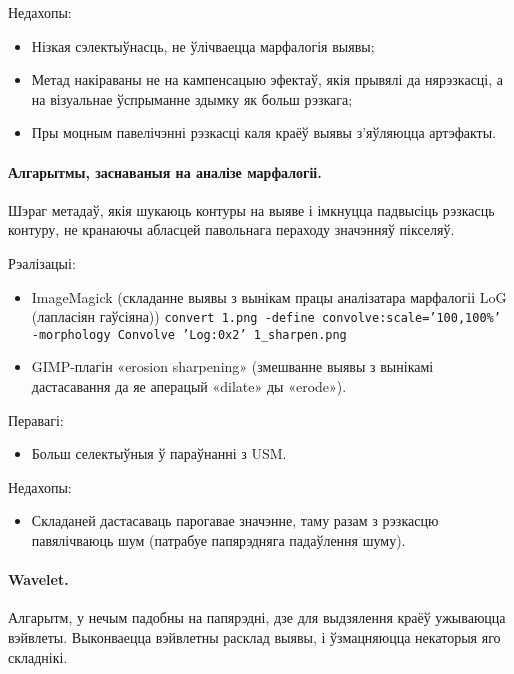 \documentclass[10pt, a5paper]{article}
\begin{document}
Недахопы:

\begin{itemize}
  \item Нізкая сэлектыўнасць, не ўлічваецца марфалогія выявы;
  \item Метад накіраваны не на кампенсацыю эфектаў, якія прывялі да нярэзкасці, а на візуальнае ўспрыманне здымку як больш рэзкага;
  \item Пры моцным павелічэнні рэзкасці каля краёў выявы з’яўляюцца артэфакты.
\end{itemize}

\paragraph*{Алгарытмы, заснаваныя на аналізе марфалогіі.} Шэраг метадаў, якія шукаюць контуры на выяве і імкнуцца падвысіць рэзкасць контуру, не кранаючы абласцей павольнага пераходу значэнняў пікселяў.

Рэалізацыі:
\begin{itemize}
  \item ImageMagick (складанне выявы з вынікам працы аналізатара марфалогіі LoG (лапласіян гаўсіяна)\cite{litv1})
\texttt{convert 1.png -define convolve:scale='100,100\%' -morphology Convolve 'Log:0x2' 1\_sharpen.png}
\end{itemize}

\begin{itemize}
  \item GIMP-плагін «erosion sharpening» (змешванне выявы з вынікамі дастасавання да яе аперацый «dilate» ды «erode»).
\end{itemize}

Перавагі:
\begin{itemize}
  \item Больш селектыўныя ў параўнанні з USM.
\end{itemize}

Недахопы:
\begin{itemize}
  \item Складаней дастасаваць парогавае значэнне, таму разам з рэзкасцю павялічваюць шум (патрабуе папярэдняга падаўлення шуму).
\end{itemize}

\paragraph*{Wavelet.} Алгарытм, у нечым падобны на папярэдні, дзе для выдзялення краёў ужываюцца вэйвлеты. Выконваецца вэйвлетны расклад выявы, і ўзмацняюцца некаторыя яго складнікі.
\end{document}
